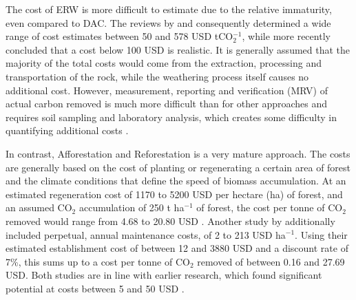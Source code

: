 The cost of ERW is more difficult to estimate due to the relative immaturity, even compared to DAC. The reviews by \textcite{fuss_negative_2018} and \textcite{beerling_farming_2018} consequently determined a wide range of cost estimates between 50 and 578 USD tCO$_2^{-1}$, while \textcite{breunig_life_2024} more recently concluded that a cost below 100 USD is realistic. It is generally assumed that the majority of the total costs would come from the extraction, processing and transportation of the rock, while the weathering process itself causes no additional cost. However, measurement, reporting and verification (MRV) of actual carbon removed is much more difficult than for other approaches and requires soil sampling and laboratory analysis, which creates some difficulty in quantifying additional costs \parencite{reershemius_initial_2023, zani_method_2024}.\vspace{2mm}

In contrast, Afforestation and Reforestation is a very mature approach. The costs are generally based on the cost of planting or regenerating a certain area of forest and the climate conditions that define the speed of biomass accumulation. At an estimated regeneration cost of 1170 to 5200 USD per hectare (ha) of forest, and an assumed CO$_2$ accumulation of 250 t ha$^{-1}$ of forest, the cost per tonne of CO$_2$ removed would range from 4.68 to 20.80 USD \parencite{michel_estimating_2026}. Another study by \textcite{bodin_standard_2022} additionally included perpetual, annual maintenance costs, of 2 to 213 USD ha$^{-1}$. Using their estimated establishment cost of between 12 and 3880 USD and a discount rate of 7\%, this sums up to a cost per tonne of CO$_2$ removed of between 0.16 and 27.69 USD. Both studies are in line with earlier research, which found significant potential at costs between 5 and 50 USD \parencite{fuss_negative_2018, busch_cost-effectiveness_2024}.

